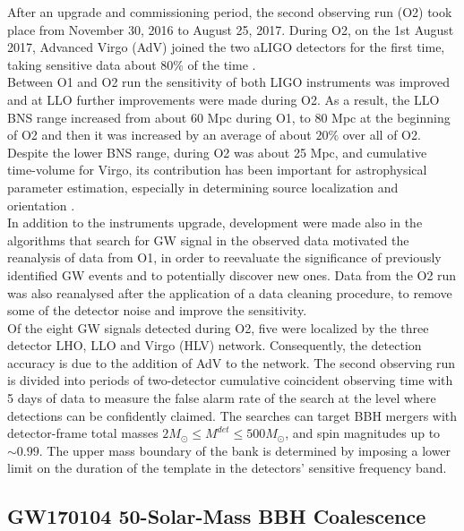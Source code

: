 \documentclass[binding=0.6cm, LaM]{sapthesis}
\begin{document}
	After an upgrade and commissioning period, the second observing run (O2) took place from November 30, 2016 to August 25, 2017. 
	During O2, on the 1st August 2017, Advanced Virgo (AdV) joined the two aLIGO detectors for the first time, 
	taking sensitive data about 80\% of the time \cite{13}.  \\
	Between O1 and O2 run the sensitivity of both LIGO instruments was improved and 
	at LLO further improvements were made during O2. 
	As a result, the LLO BNS range increased from about 60 Mpc during O1, 
	to 80 Mpc at the beginning of O2 and then it was increased 
	by an average of about $20\%$ over all of O2. 
 	Despite the lower BNS range, during O2 was about 25 Mpc, 
	and cumulative time-volume for Virgo, its contribution has been important 
	for astrophysical parameter estimation, especially in determining source localization and orientation \cite{56}. \\
	In addition to the instruments upgrade, development were made also
	in the algorithms that search for GW signal in the observed data motivated the reanalysis of data from O1, 
	in order to reevaluate the significance of previously identified GW events and to potentially discover new ones. 
	Data from the O2 run was also reanalysed after the application of a data cleaning procedure, 
	to remove some of the detector noise and improve the sensitivity. \\
	Of the eight GW signals detected during O2, five were localized by the three detector LHO, LLO and Virgo (HLV) network. 
	Consequently, the detection accuracy is  due to the addition of AdV to the network. 
	The second observing run is divided into periods of two-detector cumulative 
	coincident observing time with 5 days of data to measure the false alarm rate 
	of the search at the level where detections can be confidently claimed. 
	The searches can target BBH mergers with detector-frame total masses $2M_\odot \leq M^{det} \leq 500 M_\odot$,
	and spin magnitudes up to $\sim0.99$.
	The upper mass boundary of the bank is determined by imposing a lower limit on the duration of the template in the detectors’ sensitive frequency band.



\subsection{GW170104 50-Solar-Mass BBH Coalescence}
\end{document}
